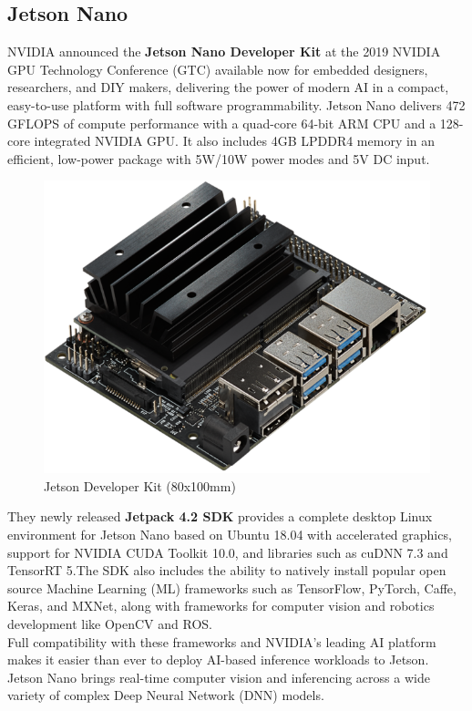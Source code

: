     \subsection{Jetson Nano}
        NVIDIA announced the \textbf{Jetson Nano Developer Kit} at the 2019 NVIDIA GPU Technology Conference (GTC) available now for embedded designers, 
        researchers, and DIY makers, delivering the power of modern AI in a compact, easy-to-use platform with full software programmability. Jetson Nano 
        delivers 472 GFLOPS of compute performance with a quad-core 64-bit ARM CPU and a 128-core integrated NVIDIA GPU. It also includes 4GB LPDDR4 memory 
        in an efficient, low-power package with 5W/10W power modes and 5V DC input.
        \begin{figure}[H]
            \centering
            \includegraphics[width=0.6\linewidth]{img/jetson_nano.png}
            \caption{Jetson Developer Kit (80x100mm)}
        \end{figure}
        They newly released \textbf{Jetpack 4.2 SDK} provides a complete desktop Linux environment for Jetson Nano based on Ubuntu 18.04 with accelerated graphics, 
        support for NVIDIA CUDA Toolkit 10.0, and libraries such as cuDNN 7.3 and TensorRT 5.The SDK also includes the ability to natively install popular open source 
        Machine Learning (ML) frameworks such as TensorFlow, PyTorch, Caffe, Keras, and MXNet, along with frameworks for computer vision and robotics development like OpenCV and ROS. \\ 
        \vspace{3mm}
        Full compatibility with these frameworks and NVIDIA’s leading AI platform makes it easier than ever to deploy AI-based inference workloads to Jetson. Jetson Nano brings real-time 
        computer vision and inferencing across a wide variety of complex Deep Neural Network (DNN) models.
